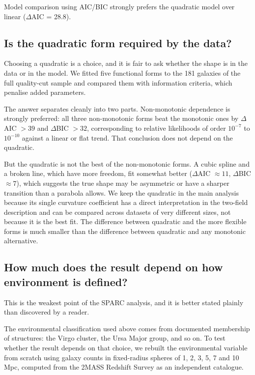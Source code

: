 \documentclass[12pt,a4paper]{article}
\begin{document}
Model comparison using AIC/BIC strongly prefers the quadratic model over linear ($\Delta$AIC = 28.8).

\subsection{Is the quadratic form required by the data?}

Choosing a quadratic is a choice, and it is fair to ask whether the shape is in the data or in the model. We fitted five functional forms to the 181 galaxies of the full quality-cut sample and compared them with information criteria, which penalise added parameters.

The answer separates cleanly into two parts. Non-monotonic dependence is strongly preferred: all three non-monotonic forms beat the monotonic ones by $\Delta$AIC $> 39$ and $\Delta$BIC $> 32$, corresponding to relative likelihoods of order $10^{-7}$ to $10^{-10}$ against a linear or flat trend. That conclusion does not depend on the quadratic.

But the quadratic is not the best of the non-monotonic forms. A cubic spline and a broken line, which have more freedom, fit somewhat better ($\Delta$AIC $\approx 11$, $\Delta$BIC $\approx 7$), which suggests the true shape may be asymmetric or have a sharper transition than a parabola allows. We keep the quadratic in the main analysis because its single curvature coefficient has a direct interpretation in the two-field description and can be compared across datasets of very different sizes, not because it is the best fit. The difference between quadratic and the more flexible forms is much smaller than the difference between quadratic and any monotonic alternative.

\subsection{How much does the result depend on how environment is defined?}

This is the weakest point of the SPARC analysis, and it is better stated plainly than discovered by a reader.

The environmental classification used above comes from documented membership of structures: the Virgo cluster, the Ursa Major group, and so on. To test whether the result depends on that choice, we rebuilt the environmental variable from scratch using galaxy counts in fixed-radius spheres of 1, 2, 3, 5, 7 and 10 Mpc, computed from the 2MASS Redshift Survey as an independent catalogue.
\end{document}
